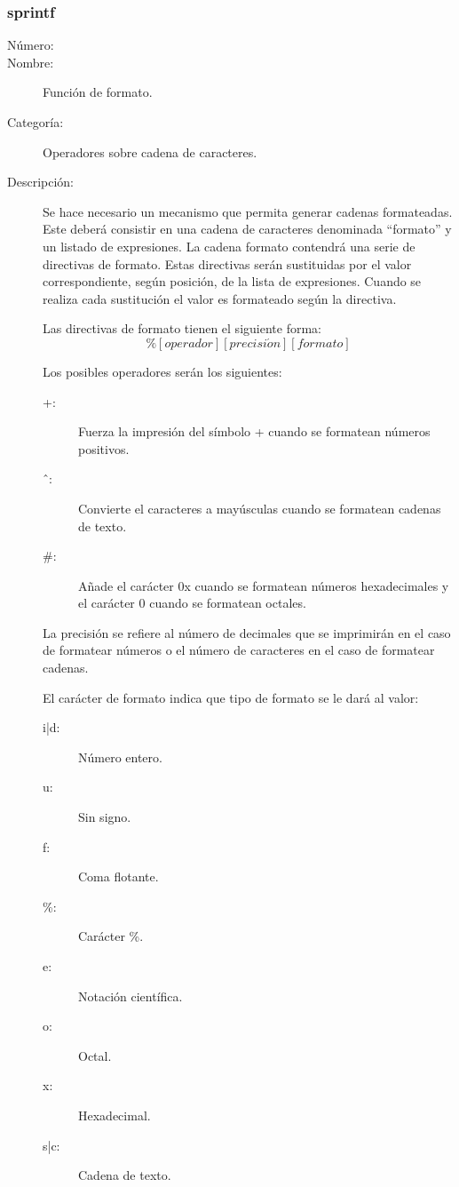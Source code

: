 \subsubsection{sprintf}
	\begin{description}
		\item [Número:] \cn
		\item [Nombre:] Función de formato.
		\item [Categoría:] Operadores sobre cadena de caracteres.
		\item [Descripción:] Se hace necesario un mecanismo que permita generar cadenas formateadas. Este deberá consistir
		en una cadena de caracteres denominada ``formato'' y un listado de expresiones. La cadena formato contendrá una serie de
		directivas de formato. Estas directivas serán sustituidas por el valor correspondiente, según posición, de la
		lista de expresiones. Cuando se realiza cada sustitución el valor es formateado según la directiva.
		
		Las directivas de formato tienen el siguiente forma:
		$$\%[operador][precisi\acute{o}n][formato]$$
		
		Los posibles operadores serán los siguientes:
		\begin{description}
			\item[+:] Fuerza la impresión del símbolo + cuando se formatean números positivos.
			\item[\^\ :] Convierte el caracteres a mayúsculas cuando se formatean cadenas de texto.
			\item[\#:] Añade el carácter 0x cuando se formatean números hexadecimales y el carácter 0 cuando se formatean octales.
		\end{description}
	
		La precisión se refiere al número de decimales que se imprimirán en el caso de formatear
		números o el número de caracteres en el caso de formatear cadenas.			

		El carácter de formato indica que tipo de formato se le dará al valor:
		\begin{description}
			\item[i|d:] Número entero.
			\item[u:] Sin signo.
			\item[f:] Coma flotante.
			\item[\%:] Carácter \%.
			\item[e:] Notación científica.
			\item[o:] Octal.
			\item[x:] Hexadecimal.
			\item[s|c:] Cadena de texto.
		\end{description}
	\end {description}

